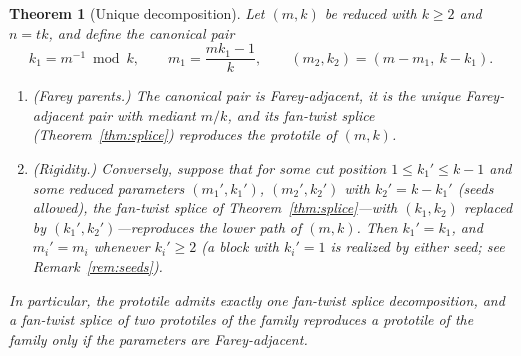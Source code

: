 \documentclass[10pt,a4paper]{amsart}
\newtheorem{theorem}{Theorem}
\begin{document}
\begin{theorem}[Unique decomposition]\label{thm:decompose}
Let $(m,k)$ be reduced with $k\ge2$ and $n=tk$, and define the \emph{canonical pair}
\[
k_1 = m^{-1} \bmod k, \qquad m_1 = \frac{mk_1-1}{k}, \qquad
(m_2,k_2)=(m-m_1,\ k-k_1).
\]
\begin{enumerate}
\item[\emph{(1)}] \emph{(Farey parents.)} The canonical pair is Farey-adjacent, it is
the unique Farey-adjacent pair with mediant $m/k$, and its fan-twist splice
(Theorem~\ref{thm:splice}) reproduces the prototile of $(m,k)$.
\item[\emph{(2)}] \emph{(Rigidity.)} Conversely, suppose that for some cut position
$1\le k_1'\le k-1$ and some reduced parameters $(m_1',k_1')$, $(m_2',k_2')$ with
$k_2'=k-k_1'$ (seeds allowed), the fan-twist splice of Theorem~\ref{thm:splice}---with
$(k_1,k_2)$ replaced by $(k_1',k_2')$---reproduces the lower path of $(m,k)$. Then
$k_1'=k_1$, and $m_i'=m_i$ whenever $k_i'\ge2$ (a block with $k_i'=1$ is realized by
either seed; see Remark~\ref{rem:seeds}).
\end{enumerate}
In particular, the prototile admits exactly one fan-twist splice decomposition, and a
fan-twist splice of two prototiles of the family reproduces a prototile of the family
\emph{only if} the parameters are Farey-adjacent.
\end{theorem}
\end{document}

